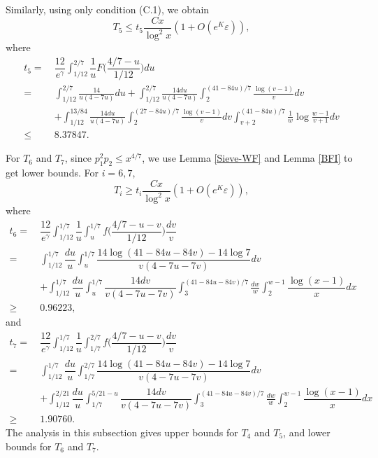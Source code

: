 \documentclass[12pt, a4paper]{amsart}
\def\le{\leqslant}
\def\ge{\geqslant}
\theoremstyle{plain}
\theoremstyle{remark}
\numberwithin{equation}{section}
\begin{document}
Similarly, using only condition (C.1), we obtain
\begin{equation}\label{T5}
	T_5 \le t_5\dfrac{Cx}{\log^2 x} (1+O(e^K\varepsilon)),
	\end{equation}
	where 
	\begin{equation}\label{t5}
	\begin{aligned}
	t_5=\ &\dfrac{12}{e^\gamma}\int_{1/12}^{2/7}\dfrac{1}{u}F\bigg(\dfrac{4/7-u}{1/12}\bigg)du\\
	=\ &\int_{1/12}^{2/7} \frac{14}{u(4-7u)}du+\int_{1/12}^{2/7} \frac{14du}{u(4-7u)}\int_2^{(41-84u)/7} \frac{\log (v-1)}{v} d v\\
	&+\int_{1/12}^{13/84} \frac{14du}{u(4-7u)}\int_2^{(27-84u)/7} \frac{\log (v-1)}{v} d v \int_{v+2}^{(41-84u)/7} \frac{1}{w} \log \frac{w-1}{v+1} dv\\
	\le\ & 8.37847.
	\end{aligned}
	\end{equation}

For \( T_6 \) and \( T_7 \), since \( p_1^2 p_2 \le x^{4/7} \), we use Lemma \ref{Sieve-WF} and Lemma \ref{BFI} to get lower bounds. For \( i = 6, 7 \),
\begin{equation}\label{T6-7}
T_i \ge t_i\dfrac{Cx}{\log^2 x} (1+O(e^K\varepsilon)),
\end{equation}
where
\begin{equation}\label{t6}
	\begin{aligned}
	t_6=\ &\dfrac{12}{e^\gamma}\int_{1/12}^{1/7}\dfrac{1}{u}\int_{u}^{1/7}f\bigg(\dfrac{4/7-u-v}{1/12}\bigg)\dfrac{dv}{v}\\
	=\ &\int_{1/12}^{1/7}\dfrac{du}{u}\int_{u}^{1/7} \dfrac{14\log (41-84u-84v)-14\log 7}{v(4-7u-7v)}dv\\
	&+\int_{1/12}^{1/7}\dfrac{du}{u}\int_{u}^{1/7} \dfrac{14dv}{v(4-7u-7v)}\int_3^{(41-84u-84v)/7} \frac{dw}{w} \int_{2}^{w-1}\dfrac{\log (x-1)}{x}dx\\
	\ge\ & 0.96223,
	\end{aligned}
	\end{equation}
	and
	\begin{equation}\label{t7}
	\begin{aligned}
	t_7=\ &\dfrac{12}{e^\gamma}\int_{1/12}^{1/7}\dfrac{1}{u}\int_{1/7}^{2/7}f\bigg(\dfrac{4/7-u-v}{1/12}\bigg)\dfrac{dv}{v}\\
	=\ &\int_{1/12}^{1/7}\dfrac{du}{u}\int_{1/7}^{2/7} \dfrac{14\log (41-84u-84v)-14\log 7}{v(4-7u-7v)}dv\\
	&+\int_{1/12}^{2/21}\dfrac{du}{u}\int_{1/7}^{5/21-u} \dfrac{14dv}{v(4-7u-7v)}\int_3^{(41-84u-84v)/7} \frac{dw}{w} \int_{2}^{w-1}\dfrac{\log (x-1)}{x}dx\\
	\ge\ & 1.90760.
	\end{aligned}
	\end{equation}
The analysis in this subsection gives upper bounds for $T_4$ and $T_5$,  and lower bounds for $T_6$ and $T_7$. 
\end{document}
